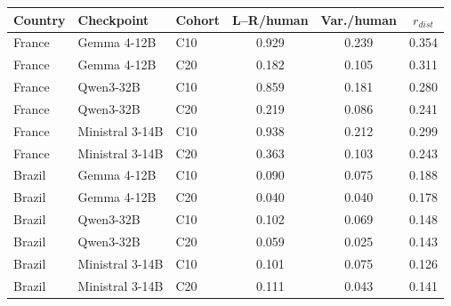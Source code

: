 \begin{tabular}{lllccc}
\toprule
Country & Checkpoint & Cohort & L--R/human & Var./human & $r_{dist}$ \\
\midrule
France & Gemma 4-12B & C10 & 0.929 & 0.239 & 0.354 \\
France & Gemma 4-12B & C20 & 0.182 & 0.105 & 0.311 \\
France & Qwen3-32B & C10 & 0.859 & 0.181 & 0.280 \\
France & Qwen3-32B & C20 & 0.219 & 0.086 & 0.241 \\
France & Ministral 3-14B & C10 & 0.938 & 0.212 & 0.299 \\
France & Ministral 3-14B & C20 & 0.363 & 0.103 & 0.243 \\
Brazil & Gemma 4-12B & C10 & 0.090 & 0.075 & 0.188 \\
Brazil & Gemma 4-12B & C20 & 0.040 & 0.040 & 0.178 \\
Brazil & Qwen3-32B & C10 & 0.102 & 0.069 & 0.148 \\
Brazil & Qwen3-32B & C20 & 0.059 & 0.025 & 0.143 \\
Brazil & Ministral 3-14B & C10 & 0.101 & 0.075 & 0.126 \\
Brazil & Ministral 3-14B & C20 & 0.111 & 0.043 & 0.141 \\
\bottomrule
\end{tabular}
